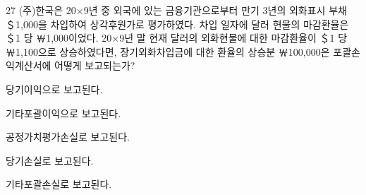 \begin{question}{27}
(주)한국은 20×9년 중 외국에 있는 금융기관으로부터 만기 3년의 외화표시 부채 ＄1,000을 차입하여 상각후원가로 평가하였다. 차입 일자에 달러 현물의 마감환율은 ＄1 당 ￦1,000이었다. 20×9년 말 현재 달러의 외화현물에 대한 마감환율이 ＄1 당 ￦1,100으로 상승하였다면, 장기외화차입금에 대한 환율의 상승분 ￦100,000은 포괄손익계산서에 어떻게 보고되는가?
\begin{choices}
  \item 당기이익으로 보고된다.
  \item 기타포괄이익으로 보고된다.
  \item 공정가치평가손실로 보고된다.
  \item 당기손실로 보고된다.
  \item 기타포괄손실로 보고된다.
\end{choices}
\end{question}
